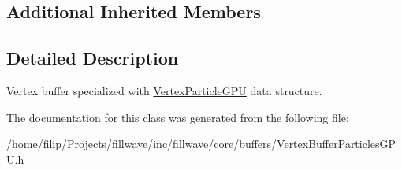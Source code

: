 \subsection*{Additional Inherited Members}


\subsection{Detailed Description}
Vertex buffer specialized with \hyperlink{structflw_1_1flc_1_1VertexParticleGPU}{Vertex\+Particle\+G\+PU} data structure. 

The documentation for this class was generated from the following file\+:\begin{DoxyCompactItemize}
\item 
/home/filip/\+Projects/fillwave/inc/fillwave/core/buffers/Vertex\+Buffer\+Particles\+G\+P\+U.\+h\end{DoxyCompactItemize}
